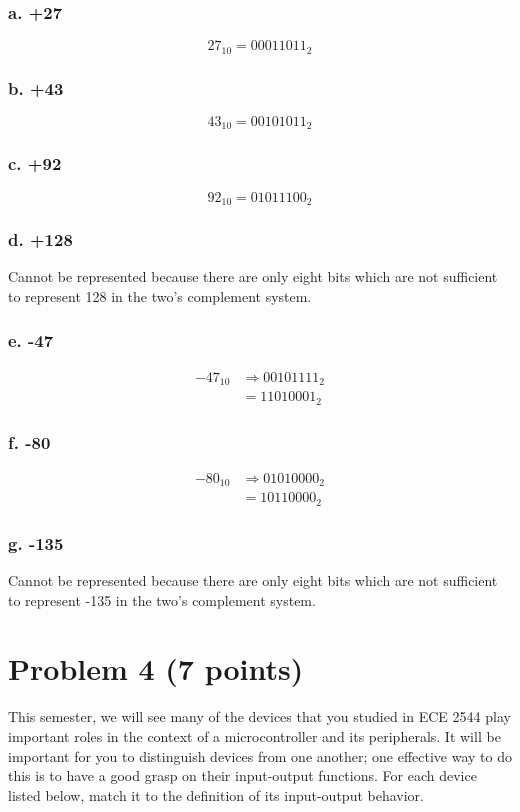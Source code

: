 \documentclass{article}
\begin{document}
\subsubsection*{a. +27}
\begin{equation}
    27_{10} = 00011011_2
\end{equation}
\subsubsection*{b. +43}
\begin{equation}
    43_{10} = 00101011_2
\end{equation}
\subsubsection*{c. +92}
\begin{equation}
    92_{10} = 01011100_2
\end{equation}
\subsubsection*{d. +128}
\begin{center}
    Cannot be represented because there are only eight bits which are not sufficient to represent 128 in the two's complement system.
\end{center}
\subsubsection*{e. -47}
\begin{align}
    -47_{10} &\Rightarrow 00101111_2\\
    &=11010001_2
\end{align}
\subsubsection*{f. -80}
\begin{align}
    -80_{10} &\Rightarrow 01010000_2\\
    &=10110000_2
\end{align}
\subsubsection*{g. -135}
\begin{center}
    Cannot be represented because there are only eight bits which are not sufficient to represent -135 in the two's complement system.
\end{center}
\newpage
\section*{Problem 4 (7 points)}
This semester, we will see many of the devices that you studied in  ECE 2544 play important roles in the context of a microcontroller and its peripherals. It will be important for you to distinguish devices from one another; one effective way to do this is to have a good grasp on their input-output functions. For each device listed below, match it to the definition of its input-output behavior.
\end{document}
